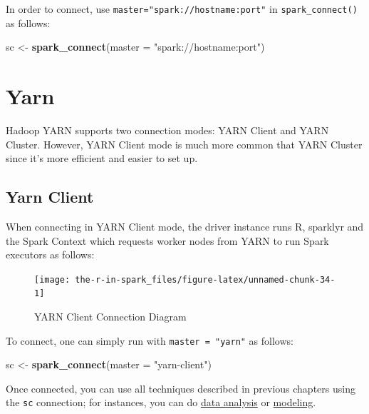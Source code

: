 \documentclass[]{book}
\newenvironment{Shaded}{\begin{snugshade}}{\end{snugshade}}
\newcommand{\DataTypeTok}[1]{\textcolor[rgb]{0.13,0.29,0.53}{#1}}
\newcommand{\KeywordTok}[1]{\textcolor[rgb]{0.13,0.29,0.53}{\textbf{#1}}}
\newcommand{\NormalTok}[1]{#1}
\newcommand{\StringTok}[1]{\textcolor[rgb]{0.31,0.60,0.02}{#1}}
\theoremstyle{definition}
\theoremstyle{definition}
\theoremstyle{definition}
\theoremstyle{remark}
\begin{document}
In order to connect, use \texttt{master="spark://hostname:port"} in
\texttt{spark\_connect()} as follows:

\begin{Shaded}
\begin{Highlighting}[]
\NormalTok{sc <-}\StringTok{ }\KeywordTok{spark_connect}\NormalTok{(}\DataTypeTok{master =} \StringTok{"spark://hostname:port"}\NormalTok{)}
\end{Highlighting}
\end{Shaded}

\hypertarget{yarn-1}{%
\section{Yarn}\label{yarn-1}}

Hadoop YARN supports two connection modes: YARN Client and YARN Cluster.
However, YARN Client mode is much more common that YARN Cluster since
it's more efficient and easier to set up.

\hypertarget{yarn-client}{%
\subsection{Yarn Client}\label{yarn-client}}

When connecting in YARN Client mode, the driver instance runs R,
sparklyr and the Spark Context which requests worker nodes from YARN to
run Spark executors as follows:

\begin{figure}

{\centering \texttt{[image: the-r-in-spark\_files/figure-latex/unnamed-chunk-34-1]} 

}

\caption{YARN Client Connection Diagram}\label{fig:unnamed-chunk-34}
\end{figure}

To connect, one can simply run with \texttt{master\ =\ "yarn"} as
follows:

\begin{Shaded}
\begin{Highlighting}[]
\NormalTok{sc <-}\StringTok{ }\KeywordTok{spark_connect}\NormalTok{(}\DataTypeTok{master =} \StringTok{"yarn-client"}\NormalTok{)}
\end{Highlighting}
\end{Shaded}

Once connected, you can use all techniques described in previous
chapters using the \texttt{sc} connection; for instances, you can do
\href{analysis}{data analysis} or
\protect\hyperlink{modeling}{modeling}.
\end{document}
